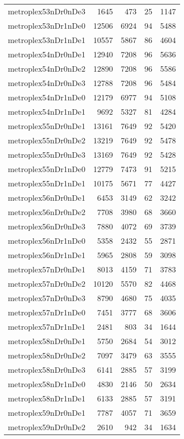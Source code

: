 \begin{longtable}{lrrrr}
metroplex53nDr0nDe3 & 1645 & 473 & 25 & 1147 \\
metroplex53nDr1nDe0 & 12506 & 6924 & 94 & 5488 \\
metroplex53nDr1nDe1 & 10557 & 5867 & 86 & 4604 \\
metroplex54nDr0nDe1 & 12940 & 7208 & 96 & 5636 \\
metroplex54nDr0nDe2 & 12890 & 7208 & 96 & 5586 \\
metroplex54nDr0nDe3 & 12788 & 7208 & 96 & 5484 \\
metroplex54nDr1nDe0 & 12179 & 6977 & 94 & 5108 \\
metroplex54nDr1nDe1 & 9692 & 5327 & 81 & 4284 \\
metroplex55nDr0nDe1 & 13161 & 7649 & 92 & 5420 \\
metroplex55nDr0nDe2 & 13219 & 7649 & 92 & 5478 \\
metroplex55nDr0nDe3 & 13169 & 7649 & 92 & 5428 \\
metroplex55nDr1nDe0 & 12779 & 7473 & 91 & 5215 \\
metroplex55nDr1nDe1 & 10175 & 5671 & 77 & 4427 \\
metroplex56nDr0nDe1 & 6453 & 3149 & 62 & 3242 \\
metroplex56nDr0nDe2 & 7708 & 3980 & 68 & 3660 \\
metroplex56nDr0nDe3 & 7880 & 4072 & 69 & 3739 \\
metroplex56nDr1nDe0 & 5358 & 2432 & 55 & 2871 \\
metroplex56nDr1nDe1 & 5965 & 2808 & 59 & 3098 \\
metroplex57nDr0nDe1 & 8013 & 4159 & 71 & 3783 \\
metroplex57nDr0nDe2 & 10120 & 5570 & 82 & 4468 \\
metroplex57nDr0nDe3 & 8790 & 4680 & 75 & 4035 \\
metroplex57nDr1nDe0 & 7451 & 3777 & 68 & 3606 \\
metroplex57nDr1nDe1 & 2481 & 803 & 34 & 1644 \\
metroplex58nDr0nDe1 & 5750 & 2684 & 54 & 3012 \\
metroplex58nDr0nDe2 & 7097 & 3479 & 63 & 3555 \\
metroplex58nDr0nDe3 & 6141 & 2885 & 57 & 3199 \\
metroplex58nDr1nDe0 & 4830 & 2146 & 50 & 2634 \\
metroplex58nDr1nDe1 & 6133 & 2885 & 57 & 3191 \\
metroplex59nDr0nDe1 & 7787 & 4057 & 71 & 3659 \\
metroplex59nDr0nDe2 & 2610 & 942 & 34 & 1634 \\

\end{longtable}
